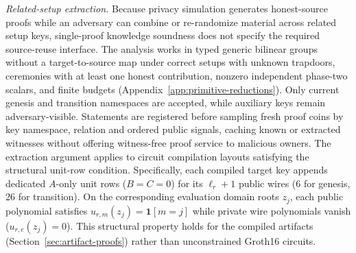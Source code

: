\documentclass[conference,compsoc]{IEEEtran}
\theoremstyle{definition}
\numberwithin{equation}{section}
\numberwithin{table}{section}
\numberwithin{figure}{section}
\theoremstyle{plain}
\begin{document}
\par\noindent\emph{Related-setup extraction.}
Because privacy simulation generates honest-source proofs while an adversary can combine or re-randomize material across related setup keys, single-proof knowledge soundness does not specify the required source-reuse interface. The analysis works in typed generic bilinear groups without a target-to-source map under correct setups with unknown trapdoors, ceremonies with at least one honest contribution, nonzero independent phase-two scalars, and finite budgets (Appendix~\ref{app:primitive-reductions}). Only current genesis and transition namespaces are accepted, while auxiliary keys remain adversary-visible. Statements are registered before sampling fresh proof coins by key namespace, relation and ordered public signals, caching known or extracted witnesses without offering witness-free proof service to malicious owners. The extraction argument applies to circuit compilation layouts satisfying the structural unit-row condition. Specifically, each compiled target key appends dedicated \(A\)-only unit rows (\(B=C=0\)) for its \(\ell_r+1\) public wires (6 for genesis, 26 for transition). On the corresponding evaluation domain roots \(z_j\), each public polynomial satisfies \(u_{r,m}(z_j)=\mathbf 1[m=j]\) while private wire polynomials vanish (\(u_{r,e}(z_j)=0\)). This structural property holds for the compiled artifacts (Section~\ref{sec:artifact-proofs}) rather than unconstrained Groth16 circuits.
\end{document}
